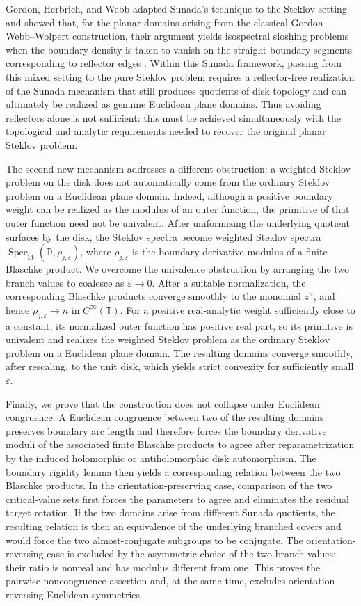 \documentclass[11pt,letterpaper,reqno]{amsart}
\theoremstyle{definition}
\newcommand{\D}{\mathbb D}
\newcommand{\T}{\mathbb T}
\newcommand{\SpecS}{\operatorname{Spec}_{\mathrm{St}}}
\begin{document}
Gordon, Herbrich, and Webb adapted Sunada's technique to the Steklov setting and showed that, for the planar domains arising from the classical Gordon--Webb--Wolpert construction, their argument yields isospectral sloshing problems when the boundary density is taken to vanish on the straight boundary segments corresponding to reflector edges \cite{GordonHerbrichWebb2021}.  Within this Sunada framework, passing from this mixed setting to the pure Steklov problem requires a reflector-free realization of the Sunada mechanism that still produces quotients of disk topology and can ultimately be realized as genuine Euclidean plane domains.  Thus avoiding reflectors alone is not sufficient: this must be achieved simultaneously with the topological and analytic requirements needed to recover the original planar Steklov problem.

The second new mechanism addresses a different obstruction: a weighted
Steklov problem on the disk does not automatically come from the
ordinary Steklov problem on a Euclidean plane domain.  Indeed, although
a positive boundary weight can be realized as the modulus of an outer
function, the primitive of that outer function need not be univalent.
After uniformizing the underlying quotient surfaces by the disk, the
Steklov spectra become weighted Steklov spectra
$\SpecS(\D,\rho_{j,\varepsilon})$, where
$\rho_{j,\varepsilon}$ is the boundary derivative modulus of a finite
Blaschke product.  We overcome the univalence obstruction by arranging
the two branch values to coalesce as $\varepsilon\to0$.  After a
suitable normalization, the corresponding Blaschke products converge
smoothly to the monomial $z^n$, and hence
$\rho_{j,\varepsilon}\to n$ in $C^\infty(\T)$.  For a positive
real-analytic weight sufficiently close to a constant, its normalized
outer function has positive real part, so its primitive is univalent
and realizes the weighted Steklov problem as the ordinary Steklov
problem on a Euclidean plane domain.  The resulting domains converge
smoothly, after rescaling, to the unit disk, which yields strict
convexity for sufficiently small $\varepsilon$.

Finally, we prove that the construction does not collapse under
Euclidean congruence.  A Euclidean congruence between two of the
resulting domains preserves boundary arc length and therefore forces
the boundary derivative moduli of the associated finite Blaschke
products to agree after reparametrization by the induced holomorphic
or antiholomorphic disk automorphism.  The boundary rigidity lemma
then yields a corresponding relation between the two Blaschke
products.  In the orientation-preserving case, comparison of the two
critical-value sets first forces the parameters to agree and eliminates
the residual target rotation.  If the two domains arise from different
Sunada quotients, the resulting relation is then an equivalence of the
underlying branched covers and would force the two almost-conjugate
subgroups to be conjugate.  The orientation-reversing case is excluded
by the asymmetric choice of the two branch values: their ratio is
nonreal and has modulus different from one.  This proves the pairwise
noncongruence assertion and, at the same time, excludes
orientation-reversing Euclidean symmetries.
\end{document}

